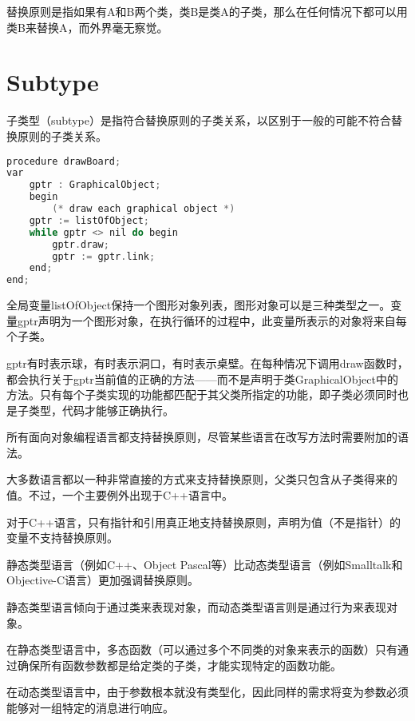 \begin{oopquote}
替换原则是指如果有A和B两个类，类B是类A的子类，那么在任何情况下都可以用类B来替换A，而外界毫无察觉。
\end{oopquote}

\chapter{Subtype}

子类型（subtype）是指符合替换原则的子类关系，以区别于一般的可能不符合替换原则的子类关系。



\begin{lstlisting}[language=C++]
procedure drawBoard;
var
	gptr : GraphicalObject;
	begin
		(* draw each graphical object *)
	gptr := listOfObject;
	while gptr <> nil do begin
		gptr.draw;
		gptr := gptr.link;
	end;
end;
\end{lstlisting}

全局变量listOfObject保持一个图形对象列表，图形对象可以是三种类型之一。变量gptr声明为一个图形对象，在执行循环的过程中，此变量所表示的对象将来自每个子类。

gptr有时表示球，有时表示洞口，有时表示桌壁。在每种情况下调用draw函数时，都会执行关于gptr当前值的正确的方法——而不是声明于类GraphicalObject中的方法。只有每个子类实现的功能都匹配于其父类所指定的功能，即子类必须同时也是子类型，代码才能够正确执行。

所有面向对象编程语言都支持替换原则，尽管某些语言在改写方法时需要附加的语法。

大多数语言都以一种非常直接的方式来支持替换原则，父类只包含从子类得来的值。不过，一个主要例外出现于C++语言中。

对于C++语言，只有指针和引用真正地支持替换原则，声明为值（不是指针）的变量不支持替换原则。

静态类型语言（例如C++、Object Pascal等）比动态类型语言（例如Smalltalk和Objective-C语言）更加强调替换原则。

静态类型语言倾向于通过类来表现对象，而动态类型语言则是通过行为来表现对象。


\begin{compactitem}
\item 在静态类型语言中，多态函数（可以通过多个不同类的对象来表示的函数）只有通过确保所有函数参数都是给定类的子类，才能实现特定的函数功能。
\item 在动态类型语言中，由于参数根本就没有类型化，因此同样的需求将变为参数必须能够对一组特定的消息进行响应。
\end{compactitem}

